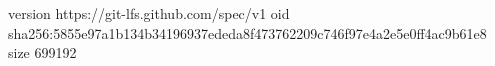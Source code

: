 version https://git-lfs.github.com/spec/v1
oid sha256:5855e97a1b134b34196937ededa8f473762209c746f97e4a2e5e0ff4ac9b61e8
size 699192
